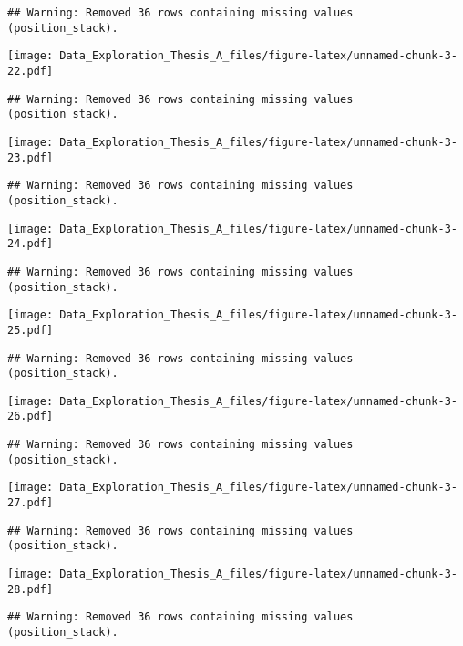 \documentclass[]{article}
\begin{document}
\begin{verbatim}
## Warning: Removed 36 rows containing missing values (position_stack).
\end{verbatim}

\texttt{[image: Data\_Exploration\_Thesis\_A\_files/figure-latex/unnamed-chunk-3-22.pdf]}

\begin{verbatim}
## Warning: Removed 36 rows containing missing values (position_stack).
\end{verbatim}

\texttt{[image: Data\_Exploration\_Thesis\_A\_files/figure-latex/unnamed-chunk-3-23.pdf]}

\begin{verbatim}
## Warning: Removed 36 rows containing missing values (position_stack).
\end{verbatim}

\texttt{[image: Data\_Exploration\_Thesis\_A\_files/figure-latex/unnamed-chunk-3-24.pdf]}

\begin{verbatim}
## Warning: Removed 36 rows containing missing values (position_stack).
\end{verbatim}

\texttt{[image: Data\_Exploration\_Thesis\_A\_files/figure-latex/unnamed-chunk-3-25.pdf]}

\begin{verbatim}
## Warning: Removed 36 rows containing missing values (position_stack).
\end{verbatim}

\texttt{[image: Data\_Exploration\_Thesis\_A\_files/figure-latex/unnamed-chunk-3-26.pdf]}

\begin{verbatim}
## Warning: Removed 36 rows containing missing values (position_stack).
\end{verbatim}

\texttt{[image: Data\_Exploration\_Thesis\_A\_files/figure-latex/unnamed-chunk-3-27.pdf]}

\begin{verbatim}
## Warning: Removed 36 rows containing missing values (position_stack).
\end{verbatim}

\texttt{[image: Data\_Exploration\_Thesis\_A\_files/figure-latex/unnamed-chunk-3-28.pdf]}

\begin{verbatim}
## Warning: Removed 36 rows containing missing values (position_stack).
\end{verbatim}
\end{document}

